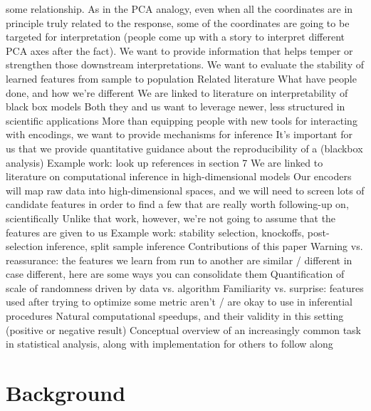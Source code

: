 \documentclass[11pt]{article}
\begin{document}
\begin{outline}
      some relationship. As in the PCA analogy, even when all the coordinates
      are in principle truly related to the response, some of the coordinates
      are going to be targeted for interpretation (people come up with a story
      to interpret different PCA axes after the fact). We want to provide
      information that helps temper or strengthen those downstream
      interpretations.
    \3 We want to evaluate the stability of learned features from sample to
    population
\1 Related literature
  \2 What have people done, and how we're different
    \3 We are linked to literature on interpretability of black box models
      \4 Both they and us want to leverage newer, less structured in scientific
      applications
      \4 More than equipping people with new tools for interacting with
      encodings, we want to provide mechanisms for inference
      \4 It's important for us that we provide quantitative guidance about the
      reproducibility of a (blackbox analysis)
      \4 Example work: look up references in \citep{raghu2020survey} section 7
    \3 We are linked to literature on computational inference in
    high-dimensional models
      \4 Our encoders will map raw data into high-dimensional spaces, and we
      will need to screen lots of candidate features in order to find a few that
      are really worth following-up on, scientifically
      \4 Unlike that work, however, we're not going to assume that the features
      are given to us
      \4 Example work: stability selection, knockoffs, post-selection inference,
      split sample inference
\1 Contributions of this paper
  \2 Warning vs. reassurance: the features we learn from run to another are
  similar / different
    \3 in case different, here are some ways you can consolidate them
    \3 Quantification of scale of randomness driven by data vs. algorithm
  \2 Familiarity vs. surprise: features used after trying to optimize some
  metric aren't / are okay to use in inferential procedures
  \2 Natural computational speedups, and their validity in this setting
  (positive or negative result)
  \2 Conceptual overview of an increasingly common task in statistical
  analysis, along with implementation for others to follow along
\end{outline}

\section{Background}
\end{document}
